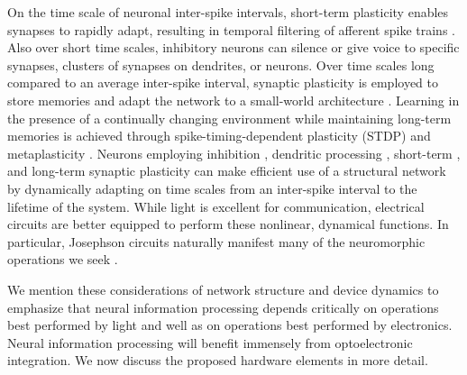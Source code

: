 \documentclass[twocolumn]{article}
\begin{document}
On the time scale of neuronal inter-spike intervals, short-term plasticity enables synapses to rapidly adapt, resulting in temporal filtering of afferent spike trains \cite{abre2004}. Also over short time scales, inhibitory neurons can silence or give voice to specific synapses, clusters of synapses on dendrites, or neurons. Over time scales long compared to an average inter-spike interval, synaptic plasticity is employed to store memories and adapt the network to a small-world architecture \cite{shki2006}. Learning in the presence of a continually changing environment while maintaining long-term memories is achieved through spike-timing-dependent plasticity (STDP) \cite{somi2000,mage2012} and metaplasticity \cite{fudr2005,ab2008}. Neurons employing inhibition \cite{budr2004}, dendritic processing \cite{haah2015,stsp2015,sava2017}, short-term \cite{abre2004}, and long-term synaptic plasticity \cite{somi2000,mage2012,ab2008,fudr2005} can make efficient use of a structural network by dynamically adapting on time scales from an inter-spike interval to the lifetime of the system. While light is excellent for communication, electrical circuits are better equipped to perform these nonlinear, dynamical functions. In particular, Josephson circuits naturally manifest many of the neuromorphic operations we seek \cite{sh2018}.

We mention these considerations of network structure and device dynamics to emphasize that neural information processing depends critically on operations best performed by light and well as on operations best performed by electronics. Neural information processing will benefit immensely from optoelectronic integration. We now discuss the proposed hardware elements in more detail.
\end{document}
